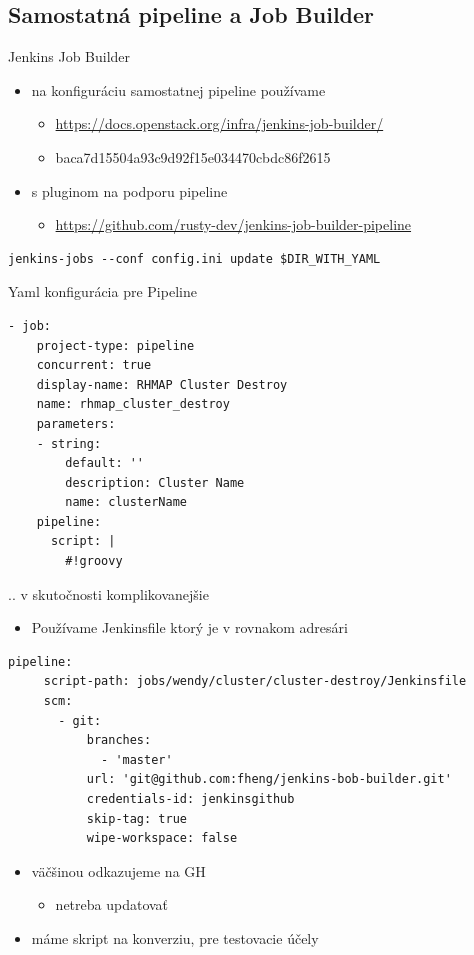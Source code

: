 \documentclass[bigger]{beamer}
\begin{document}
\subsection{Samostatná pipeline a Job Builder}
\label{sec:orgcc75edb}
\begin{frame}[fragile,label={sec:org31a0119}]{Jenkins Job Builder}
 \begin{itemize}
\item na konfiguráciu samostatnej pipeline používame
\begin{itemize}
\item \url{https://docs.openstack.org/infra/jenkins-job-builder/}
\item baca7d15504a93c9d92f15e034470cbdc86f2615
\end{itemize}
\item s pluginom na podporu pipeline
\begin{itemize}
\item \url{https://github.com/rusty-dev/jenkins-job-builder-pipeline}
\end{itemize}
\end{itemize}
\begin{verbatim}
jenkins-jobs --conf config.ini update $DIR_WITH_YAML 
\end{verbatim}
\end{frame}
\begin{frame}[fragile,label={sec:orgc2b058e}]{Yaml konfigurácia pre Pipeline}
 \begin{verbatim}
- job:
    project-type: pipeline
    concurrent: true
    display-name: RHMAP Cluster Destroy
    name: rhmap_cluster_destroy
    parameters:
    - string:
        default: ''
        description: Cluster Name
        name: clusterName
    pipeline:
      script: |
        #!groovy
\end{verbatim}
\end{frame}
\begin{frame}[fragile,label={sec:org08e0f87}]{.. v skutočnosti komplikovanejšie}
 \begin{itemize}
\item Používame Jenkinsfile ktorý je v rovnakom adresári
\end{itemize}
\begin{verbatim}
pipeline:
     script-path: jobs/wendy/cluster/cluster-destroy/Jenkinsfile
     scm:
       - git:
           branches:
             - 'master'
           url: 'git@github.com:fheng/jenkins-bob-builder.git'
           credentials-id: jenkinsgithub
           skip-tag: true
           wipe-workspace: false
\end{verbatim}
\begin{itemize}
\item väčšinou odkazujeme na GH
\begin{itemize}
\item netreba updatovať
\end{itemize}
\item máme skript na konverziu, pre testovacie účely
\end{itemize}
\end{frame}
\end{document}
